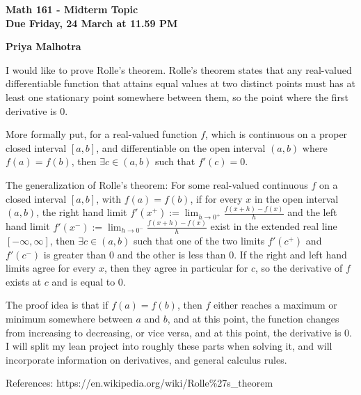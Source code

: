 \documentclass[11pt]{letter}
\begin{document}
\textbf{Math 161 - Midterm Topic} \\
\textbf{Due Friday, 24 March at 11.59 PM}

\textbf{Priya Malhotra}

I would like to prove Rolle's theorem. Rolle's theorem states that any real-valued differentiable function that attains equal values at two distinct points must has at least one stationary point somewhere between them, so the point where the first derivative is 0. 

More formally put, for a real-valued function $f$, which is continuous on a proper closed interval $[a,b]$, and differentiable on the open interval $(a,b)$ where $f(a) = f(b)$, then $\exists c \in (a,b)$ such that $f'(c) = 0$. 

The generalization of Rolle's theorem: For some real-valued continuous $f$ on a closed interval $[a,b]$, with $f(a) = f(b)$, if for every $x$ in the open interval $(a,b)$, the right hand limit $f'(x^+) := \lim_{h \rightarrow 0^+} \frac{f(x+h) - f(x)}{h}$ and the left hand limit $f'(x^-) := \lim_{h \rightarrow 0^-} \frac{f(x+h) - f(x)}{h}$ exist in the extended real line $[-\infty, \infty]$, then $\exists c \in (a,b)$ such that one of the two limits $f'(c^+)$ and $f'(c^-)$ is greater than 0 and the other is less than 0. If the right and left hand limits agree for every $x$, then they agree in particular for $c$, so the derivative of $f$ exists at $c$ and is equal to 0. 

The proof idea is that if $f(a) = f(b)$, then $f$ either reaches a maximum or minimum somewhere between $a$ and $b$, and at this point, the function changes from increasing to decreasing, or vice versa, and at this point, the derivative is 0. I will split my lean project into roughly these parts when solving it, and will incorporate information on derivatives, and general calculus rules. 



References:
https://en.wikipedia.org/wiki/Rolle\%27s\_theorem
\end{document}
